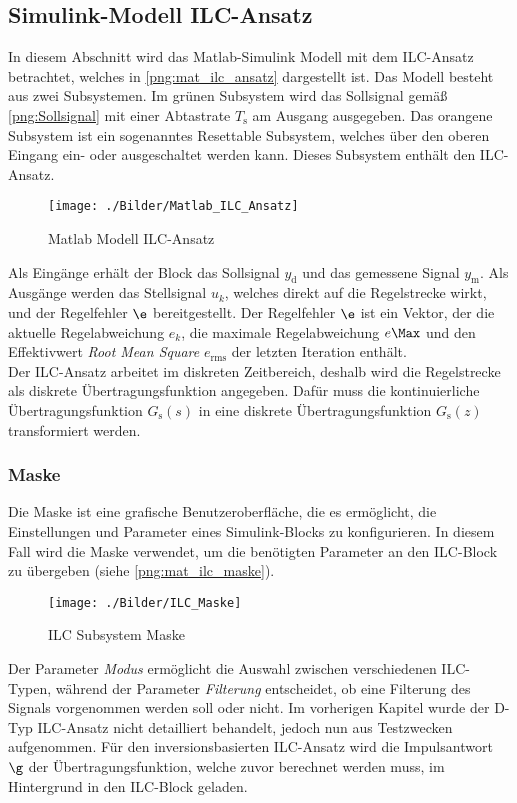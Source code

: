 \subsection{Simulink-Modell ILC-Ansatz}
\label{subsec_simulink_modell}
In diesem Abschnitt wird das Matlab-Simulink Modell mit dem ILC-Ansatz betrachtet, welches in \autoref{png:mat_ilc_ansatz} dargestellt ist. Das Modell besteht aus zwei Subsystemen. Im grünen Subsystem wird das Sollsignal gemäß \autoref{png:Sollsignal} mit einer Abtastrate $T_\mathrm{s}$ am Ausgang ausgegeben. Das orangene Subsystem ist ein sogenanntes Resettable Subsystem, welches über den oberen Eingang ein- oder ausgeschaltet werden kann. Dieses Subsystem enthält den ILC-Ansatz.
\begin{figure}[H]
	\centering
	\texttt{[image: ./Bilder/Matlab\_ILC\_Ansatz]}
	\caption{Matlab Modell ILC-Ansatz}
	\label{png:mat_ilc_ansatz}
\end{figure}
Als Eingänge erhält der Block das Sollsignal $y_\mathrm{d}$ und das gemessene Signal $y_\mathrm{m}$. Als Ausgänge werden das Stellsignal $u_k$, welches direkt auf die Regelstrecke wirkt, und der Regelfehler $\e$ bereitgestellt. Der Regelfehler $\e$ ist ein Vektor, der die aktuelle Regelabweichung $e_k$, die maximale Regelabweichung $e\Max$ und den Effektivwert \textit{Root Mean Square} $e_\mathrm{rms}$ der letzten Iteration enthält.\\
Der ILC-Ansatz arbeitet im diskreten Zeitbereich, deshalb wird die Regelstrecke als diskrete Übertragungsfunktion angegeben. Dafür muss die kontinuierliche Übertragungsfunktion $G_\mathrm{s}(s)$ in eine diskrete Übertragungsfunktion $G_\mathrm{s}(z)$ transformiert werden.
\subsubsection{Maske}
Die Maske ist eine grafische Benutzeroberfläche, die es ermöglicht, die Einstellungen und Parameter eines Simulink-Blocks zu konfigurieren. In diesem Fall wird die Maske verwendet, um die benötigten Parameter an den ILC-Block zu übergeben (siehe \autoref{png:mat_ilc_maske}).
\begin{figure}[ht]
	\centering
	\texttt{[image: ./Bilder/ILC\_Maske]}
	\caption{ILC Subsystem Maske}
	\label{png:mat_ilc_maske}
\end{figure}
Der Parameter \textit{Modus} ermöglicht die Auswahl zwischen verschiedenen ILC-Typen, während der Parameter \textit{Filterung} entscheidet, ob eine Filterung des Signals vorgenommen werden soll oder nicht. Im vorherigen Kapitel wurde der D-Typ ILC-Ansatz nicht detailliert behandelt, jedoch nun aus Testzwecken aufgenommen. Für den inversionsbasierten ILC-Ansatz wird die Impulsantwort $\g$ der Übertragungsfunktion, welche zuvor berechnet werden muss, im Hintergrund in den ILC-Block geladen.
